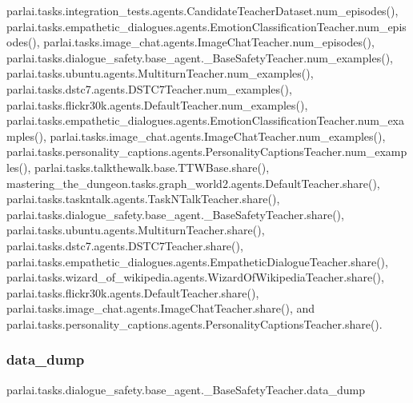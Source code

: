 parlai.\+tasks.\+integration\+\_\+tests.\+agents.\+Candidate\+Teacher\+Dataset.\+num\+\_\+episodes(), parlai.\+tasks.\+empathetic\+\_\+dialogues.\+agents.\+Emotion\+Classification\+Teacher.\+num\+\_\+episodes(), parlai.\+tasks.\+image\+\_\+chat.\+agents.\+Image\+Chat\+Teacher.\+num\+\_\+episodes(), parlai.\+tasks.\+dialogue\+\_\+safety.\+base\+\_\+agent.\+\_\+\+Base\+Safety\+Teacher.\+num\+\_\+examples(), parlai.\+tasks.\+ubuntu.\+agents.\+Multiturn\+Teacher.\+num\+\_\+examples(), parlai.\+tasks.\+dstc7.\+agents.\+D\+S\+T\+C7\+Teacher.\+num\+\_\+examples(), parlai.\+tasks.\+flickr30k.\+agents.\+Default\+Teacher.\+num\+\_\+examples(), parlai.\+tasks.\+empathetic\+\_\+dialogues.\+agents.\+Emotion\+Classification\+Teacher.\+num\+\_\+examples(), parlai.\+tasks.\+image\+\_\+chat.\+agents.\+Image\+Chat\+Teacher.\+num\+\_\+examples(), parlai.\+tasks.\+personality\+\_\+captions.\+agents.\+Personality\+Captions\+Teacher.\+num\+\_\+examples(), parlai.\+tasks.\+talkthewalk.\+base.\+T\+T\+W\+Base.\+share(), mastering\+\_\+the\+\_\+dungeon.\+tasks.\+graph\+\_\+world2.\+agents.\+Default\+Teacher.\+share(), parlai.\+tasks.\+taskntalk.\+agents.\+Task\+N\+Talk\+Teacher.\+share(), parlai.\+tasks.\+dialogue\+\_\+safety.\+base\+\_\+agent.\+\_\+\+Base\+Safety\+Teacher.\+share(), parlai.\+tasks.\+ubuntu.\+agents.\+Multiturn\+Teacher.\+share(), parlai.\+tasks.\+dstc7.\+agents.\+D\+S\+T\+C7\+Teacher.\+share(), parlai.\+tasks.\+empathetic\+\_\+dialogues.\+agents.\+Empathetic\+Dialogue\+Teacher.\+share(), parlai.\+tasks.\+wizard\+\_\+of\+\_\+wikipedia.\+agents.\+Wizard\+Of\+Wikipedia\+Teacher.\+share(), parlai.\+tasks.\+flickr30k.\+agents.\+Default\+Teacher.\+share(), parlai.\+tasks.\+image\+\_\+chat.\+agents.\+Image\+Chat\+Teacher.\+share(), and parlai.\+tasks.\+personality\+\_\+captions.\+agents.\+Personality\+Captions\+Teacher.\+share().

\mbox{\label{classparlai_1_1tasks_1_1dialogue__safety_1_1base__agent_1_1__BaseSafetyTeacher_aa689aab73ec3cfd0047bb8ec694893b3}} 
\subsubsection{\texorpdfstring{data\+\_\+dump}{data\_dump}}
{\footnotesize\ttfamily parlai.\+tasks.\+dialogue\+\_\+safety.\+base\+\_\+agent.\+\_\+\+Base\+Safety\+Teacher.\+data\+\_\+dump}



